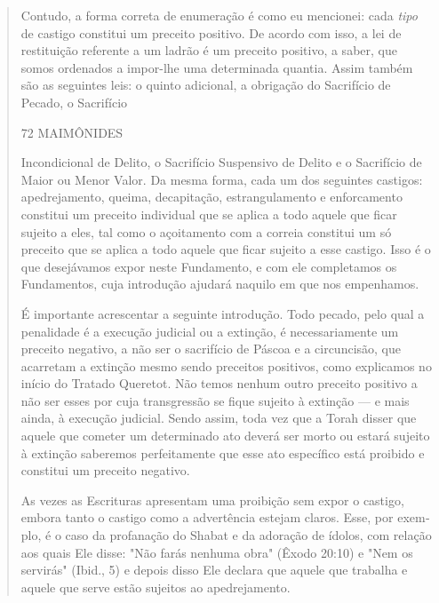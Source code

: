 \begin{quote}
Contudo, a forma correta de enumeração é como eu mencionei: ca­da
\emph{tipo} de castigo constitui um preceito positivo. De acordo com
isso, a lei de restituição referente a um ladrão é um preceito positivo,
a saber, que somos ordenados a impor-lhe uma determinada quantia. Assim
também são as seguin­tes leis: o quinto adicional, a obrigação do
Sacrifício de Pecado, o Sacrifício

72 MAIMÔNIDES

Incondicional de Delito, o Sacrifício Suspensivo de Delito e o
Sacrifício de Maior ou Menor Valor. Da mesma forma, cada um dos
seguintes castigos: apedreja­mento, queima, decapitação, estrangulamento
e enforcamento constitui um pre­ceito individual que se aplica a todo
aquele que ficar sujeito a eles, tal como o açoitamento com a correia
constitui um só preceito que se aplica a todo aquele que ficar sujeito a
esse castigo. Isso é o que desejávamos expor neste Funda­mento, e com
ele completamos os Fundamentos, cuja introdução ajudará na­quilo em que
nos empenhamos.

É importante acrescentar a seguinte introdução. Todo pecado, pelo qual a
penalidade é a execução judicial ou a extinção, é necessariamente um
preceito negativo, a não ser o sacrifício de Páscoa e a circuncisão, que
acarre­tam a extinção mesmo sendo preceitos positivos, como explicamos
no início do Tratado Queretot. Não temos nenhum outro preceito positivo
a não ser es­ses por cuja transgressão se fique sujeito à extinção --- e
mais ainda, à execução judicial. Sendo assim, toda vez que a Torah
disser que aquele que cometer um determinado ato deverá ser morto ou
estará sujeito à extinção saberemos per­feitamente que esse ato
específico está proibido e constitui um preceito negativo.

As vezes as Escrituras apresentam uma proibição sem expor o casti­go,
embora tanto o castigo como a advertência estejam claros. Esse, por
exem­plo, é o caso da profanação do Shabat e da adoração de ídolos, com
relação aos quais Ele disse: "Não farás nenhuma obra" (Êxodo 20:10) e
"Nem os servi­rás" (Ibid., 5) e depois disso Ele declara que aquele que
trabalha e aquele que serve estão sujeitos ao apedrejamento.


\end{quote}
